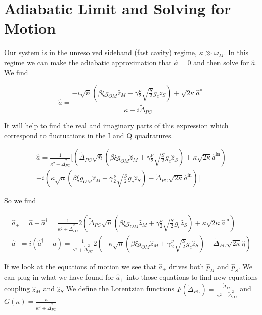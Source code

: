 \documentclass[12pt]{article}
\begin{document}
\section{Adiabatic Limit and Solving for Motion}

Our system is in the unresolved sideband (fast cavity) regime, $\kappa \gg \omega_M$. In this regime we can make the adiabatic approximation that  $\dot{\hat{a}} = 0$ and then solve for $\hat{a}$. We find

\begin{equation}
\hat{a} = \frac{-i \sqrt{\bar{n}} \left( \beta \xi g_{OM} \hat{z}_M + \gamma \frac{\nu}{2} \sqrt{\frac{S}{2}} g_c \hat{z}_S \right) + \sqrt{2 \kappa} \hat{a}^{\text{in}}}{\kappa - i \tilde{\Delta}_{PC}}
\end{equation}

It will help to find the real and imaginary parts of this expression which correspond to fluctuations in the I and Q quadratures.

\begin{align*}
\hat{a} = \frac{1}{\kappa^2 + \tilde{\Delta}_{PC}^2} \Biggl[\left( \tilde{\Delta}_{PC} \sqrt{\bar{n}} \left( \beta \xi g_{OM} \hat{z}_M + \gamma \frac{\nu}{2} \sqrt{\frac{S}{2}} g_c \hat{z}_S \right) + \kappa \sqrt{2 \kappa} \hat{a}^{\text{in}}\right)\\
 -i \left(\kappa \sqrt{n}  \left( \beta \xi g_{OM} \hat{z}_M + \gamma \frac{\nu}{2} \sqrt{\frac{S}{2}} g_c \hat{z}_S \right) -\tilde{\Delta}_{PC} \sqrt{2 \kappa} \hat{a}^{\text{in}}  \right) \Biggr]
\end{align*}

So we find

\begin{align}
\hat{a}_+ = \hat{a} + \hat{a}^{\dag} = \frac{1}{\kappa^2 + \tilde{\Delta}_{PC}^2} 2 \left( \tilde{\Delta}_{PC} \sqrt{\bar{n}} \left( \beta \xi g_{OM} \hat{z}_M + \gamma \frac{\nu}{2} \sqrt{\frac{S}{2}} g_c \hat{z}_S \right) + \kappa \sqrt{2 \kappa} \hat{a}^{\text{in}}\right)\\
\hat{a}_- = i(\hat{a}^{\dag} - \hat{a}) = \frac{1}{\kappa^2 + \tilde{\Delta}_{PC}^2} 2 \left( -\kappa \sqrt{n}  \left( \beta \xi g_{OM} \hat{z}_M + \gamma \frac{\nu}{2} \sqrt{\frac{S}{2}} g_c \hat{z}_S \right) +\tilde{\Delta}_{PC} \sqrt{2 \kappa} \hat{\eta}  \right)
\end{align}

If we look at the equations of motion we see that $\hat{a}_+$ drives both $\hat{p}_M$ and $\hat{p}_S$. We can plug in what we have found for $\hat{a}_+$ into those equations to find new equations coupling $\hat{z}_M$ and $\hat{z}_S$
We define the Lorentzian functions $F(\tilde{\Delta}_{PC}) = \frac{\tilde{\Delta}_{PC}}{\kappa^2 + \tilde{\Delta}_{PC}^2}$ and $G(\kappa) = \frac{\kappa}{\kappa^2 + \tilde{\Delta}_{PC}^2}$
\end{document}
